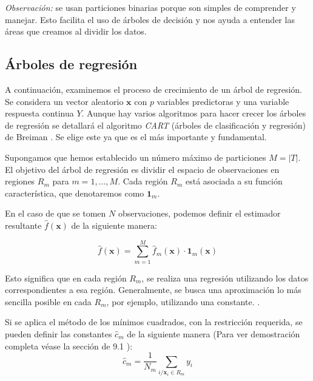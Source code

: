 \noindent \emph{Observación:} se usan particiones binarias porque son simples de comprender y manejar. Esto facilita el uso de árboles de decisión y nos ayuda a entender las áreas que creamos al dividir los datos.


\subsection{Árboles de regresión }
\noindent A continuación, examinemos el  proceso de crecimiento de un árbol de regresión. Se considera un vector aleatorio $\mathbf{x}$ con $p$ variables predictoras y una variable respuesta continua $Y$. Aunque hay varios algoritmos para hacer crecer los árboles de regresión se detallará el algoritmo \emph{CART} (árboles de clasificación y regresión) de Breiman \cite{Breiman 1984}. Se elige este ya que es el más importante y fundamental. 

\noindent Supongamos que hemos establecido un número máximo de particiones $M=|T|$. El objetivo del árbol de regresión es dividir el espacio de observaciones en regiones $R_m$ para $m=1,\ldots, M$. Cada región $R_m$ está asociada a su función característica, que denotaremos como $\mathbf{1}_m$.

\noindent En el caso de que se tomen $N$ observaciones, podemos definir el estimador resultante $\hat{f}(\mathbf{x})$ de la siguiente manera:

\begin{equation}
\hat{f}(\mathbf{x})=\sum_{m=1}^M \hat{f}_m(\mathbf{x})\cdot \mathbf{1}_m(\mathbf{x})
\end{equation}

\noindent Esto significa que en cada región $R_m$, se realiza una regresión utilizando los datos correspondientes a esa región. Generalmente, se busca una aproximación lo más sencilla posible en cada $R_m$, por ejemplo, utilizando una constante. \cite{Biau 2016,Hastie 2001}.

\noindent Si se aplica el método de los mínimos cuadrados, con la restricción requerida, se pueden definir las constantes $\hat{c}_m$ de la siguiente manera (Para ver demostración completa véase la sección de 9.1 \cite{Breiman 1984}):
\begin{equation}
\hat{c}_m=\dfrac{1}{N_m}\sum_{i/\mathbf{x}_i\in R_m} y_i
\end{equation}

